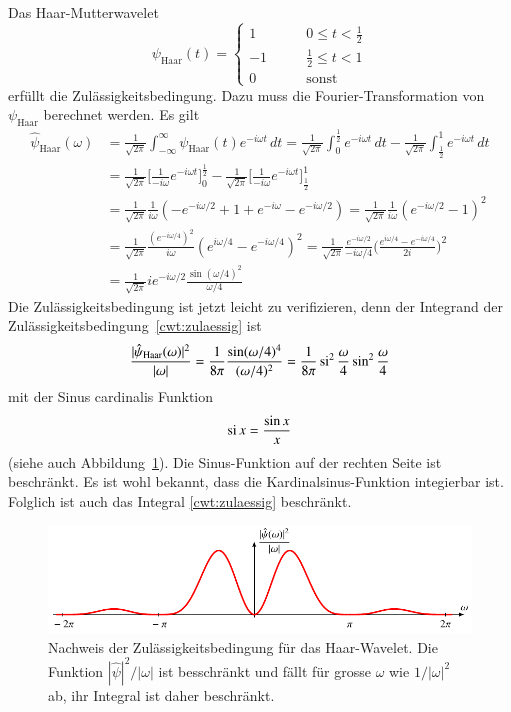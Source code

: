 \begin{beispiel}
Das Haar-Mutterwavelet
\[
\psi_{\text{Haar}}(t) = \begin{cases}
 1&\qquad 0\le t < \frac12\\
-1&\qquad \frac12 \le t < 1\\
 0&\qquad \text{sonst}
\end{cases}
\]
erfüllt die Zulässigkeitsbedingung.
Dazu muss die Fourier-Transformation von $\psi_{\text{Haar}}$ berechnet
werden.
Es gilt
\begin{align*}
\hat{\psi}_{\text{Haar}}(\omega)
&=
\frac{1}{\sqrt{2\pi}}
\int_{-\infty}^\infty \psi_{\text{Haar}}(t) e^{-i\omega t}\,dt
=
\frac{1}{\sqrt{2\pi}}
\int_0^{\frac12} e^{-i\omega t}\,dt
-
\frac1{\sqrt{2\pi}}
\int_{\frac12}^1e^{-i\omega t}\,dt
\\
&=
\frac1{\sqrt{2\pi}}
\biggl[\frac1{-i\omega}e^{-i\omega t} \biggr]_0^{\frac12}
-
\frac1{\sqrt{2\pi}}
\biggl[\frac1{-i\omega}e^{-i\omega t} \biggr]_{\frac12}^1
\\
&=
\frac{1}{\sqrt{2\pi}}
\frac{1}{i\omega}
(
-e^{-i\omega/2} + 1 + e^{-i\omega} - e^{-i\omega/2}
)
=
\frac{1}{\sqrt{2\pi}}
\frac{1}{i\omega}
( e^{-i\omega/2}-1)^2
\\
&=
\frac{1}{\sqrt{2\pi}}
\frac{(e^{-i\omega/4})^2}{i\omega}
( e^{i\omega/4} - e^{-i\omega/4})^2
=
\frac{1}{\sqrt{2\pi}}
\frac{e^{-i\omega/2}}{-i\omega/4}
\biggl(\frac{e^{i\omega/4}-e^{-i\omega/4}}{2i}\biggr)^2
\\
&=
\frac{1}{\sqrt{2\pi}}
ie^{-i\omega/2}
\frac{\sin(\omega/4)^2}{\omega/4}
\end{align*}
Die Zulässigkeitsbedingung ist jetzt leicht zu verifizieren, denn
der Integrand der Zulässigkeitsbedingung~\eqref{cwt:zulaessig} ist
\[
\frac{|\hat{\psi}_{\text{Haar}}(\omega)|^2}{|\omega|}
=
\frac{1}{8\pi}\frac{\sin(\omega/4)^4}{(\omega/4)^2}
=
\frac{1}{8\pi}\si^2\frac{\omega}4 \sin^2 \frac{\omega}4
\]
mit der Sinus cardinalis Funktion
\[
\si x = \frac{\sin x}{x}
\]
(siehe auch Abbildung~\ref{cwt:figure:haarzulaessig}).
Die Sinus-Funktion auf der rechten Seite ist beschränkt.
Es ist wohl bekannt, dass die Kardinalsinus-Funktion integierbar ist.
Folglich ist auch das Integral \eqref{cwt:zulaessig} beschränkt.
\end{beispiel}

\begin{figure}
\centering
\includegraphics{chapters/4-cwt/images/hatpsi.pdf}
\caption{Nachweis der Zulässigkeitsbedingung für das Haar-Wavelet.
Die Funktion $|\hat{\psi}|^2/|\omega|$ ist besschränkt und fällt
für grosse $\omega$ wie $1/|\omega|^2$ ab, ihr Integral ist daher
beschränkt.
\label{cwt:figure:haarzulaessig}}
\end{figure}

